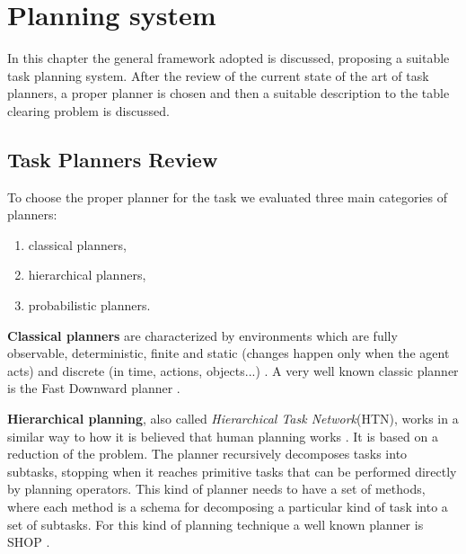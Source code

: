 \chapter{Planning system}
\label{ch:planning_system}
In this chapter the general framework adopted is discussed, proposing a suitable task planning system. After the  review of the current state of the art of task planners, a proper planner is chosen and then a suitable description to the table clearing problem is discussed.
\section{Task Planners Review}
To choose the proper planner for the task we evaluated three main categories of planners:
\begin{enumerate}
\item classical planners,
\item hierarchical planners,
\item probabilistic planners.
\end{enumerate}

\textbf{Classical planners} are characterized by environments which are fully observable, deterministic, finite and static (changes happen only when the agent acts) and discrete (in time, actions, objects...) \citep{artificialIntelligence}.  A very well known classic planner is the Fast Downward planner \cite{helmert2006fast}.


\textbf{Hierarchical planning}, also called \textit{Hierarchical Task Network}(HTN), works in a similar way to how it is believed that human planning 
works \citep{marthi2007angelic}. It is based on a reduction of the problem. The planner recursively decomposes tasks into subtasks, stopping when it reaches primitive tasks that can be performed directly by planning operators. This kind of planner needs to have a set of methods, where each method is a schema for decomposing a particular kind of task into a set of subtasks. For this kind of planning technique a well known planner is SHOP \citep{shop}.

